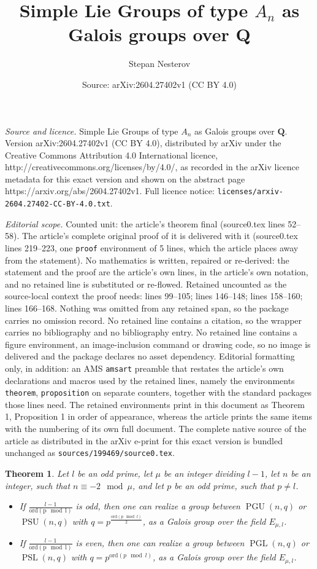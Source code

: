 \documentclass[10pt,a4paper]{amsart}
\title{Simple Lie Groups of type $A_n$ as Galois groups over $\mathbf{Q}$}
\author{Stepan Nesterov}
\date{Source: arXiv:2604.27402v1 (CC BY 4.0)}
\newtheorem{theorem}{Theorem}
\DeclareMathOperator{\PGL}{\mathrm{PGL}}
\DeclareMathOperator{\PGU}{\mathrm{PGU}}
\DeclareMathOperator{\PSL}{\mathrm{PSL}}
\DeclareMathOperator{\PSU}{\mathrm{PSU}}
\begin{document}
\maketitle

\noindent\emph{Source and licence.} Simple Lie Groups of type $A_n$ as Galois groups over $\mathbf{Q}$. Version arXiv:2604.27402v1 (CC BY 4.0), distributed by arXiv under the Creative Commons Attribution 4.0 International licence, http://creativecommons.org/licenses/by/4.0/, as recorded in the arXiv licence metadata for this exact version and shown on the abstract page https://arxiv.org/abs/2604.27402v1. Full licence notice: \texttt{licenses/arxiv-2604.27402-CC-BY-4.0.txt}.\par\smallskip

\noindent\textit{Editorial scope.} Counted unit: the article's theorem final (source0.tex lines 52--58). The article's complete original proof of it is delivered with it (source0.tex lines 219--223, one \texttt{proof} environment of 5 lines, which the article places away from the statement). No mathematics is written, repaired or re-derived: the statement and the proof are the article's own lines, in the article's own notation, and no retained line is substituted or re-flowed.  Retained uncounted as the source-local context the proof needs: lines 99--105; lines 146--148; lines 158--160; lines 166--168.  Nothing was omitted from any retained span, so the package carries no omission record.  No retained line contains a citation, so the wrapper carries no bibliography and no bibliography entry.  No retained line contains a figure environment, an image-inclusion command or drawing code, so no image is delivered and the package declares no asset dependency.  Editorial formatting only, in addition: an AMS \texttt{amsart} preamble that restates the article's own declarations and macros used by the retained lines, namely the environments \texttt{theorem}, \texttt{proposition} on separate counters, together with the standard packages those lines need.  The retained environments print in this document as Theorem 1, Proposition 1 in order of appearance, whereas the article prints the same items with the numbering of its own full document.  The complete native source of the article as distributed in the arXiv e-print for this exact version is bundled unchanged as \texttt{sources/199469/source0.tex}.
	\begin{theorem} \label{main}
		Let $l$ be an odd prime, let $\mu$ be an integer dividing $l-1$, let $n$ be an integer, such that $n \equiv -2 \mod \mu$, and let $p$ be an odd prime, such that $p \neq l$.  
		\begin{itemize}
			\item If $\frac{l-1}{\mathrm{ord (p \mod l)}}$ is odd, then one can realize a group between  $\PGU(n,q)$ or $\PSU(n,q)$ with $q=p^{\frac{\mathrm{ord} (p \mod l)}{2}}$, as a Galois group over the field $E_{\mu,l}$.
			\item If $\frac{l-1}{\mathrm{ord (p \mod l)}}$ is even, then one can realize a group between  $\PGL(n,q)$ or $\PSL(n,q)$ with $q=p^{\mathrm{ord} (p \mod l)}$, as a Galois group over the field $E_{\mu,l}$.
		\end{itemize}
	\end{theorem}
\end{document}
